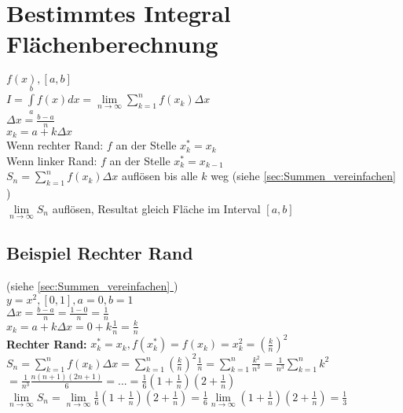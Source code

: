 \documentclass[../main.tex]{subfiles}
\begin{document}
\section{Bestimmtes Integral Flächenberechnung}
$f(x), [a,b]$ \\ [7pt]
$I = \int\limits_a^bf(x)dx = \lim\limits_{n \to \infty} \sum\limits^n_{k=1}f(x_k)\Delta x$ \\ [7pt]
$\Delta x = \frac{b-a}{n}$ \\ [7pt]
$x_k = a + k \Delta x$ \\ [7pt]
Wenn rechter Rand: $f$ an der Stelle $x^*_k = x_k$ \\ [7pt]
Wenn linker Rand: $f$ an der Stelle $x^*_k = x_{k-1}$ \\ [7pt]
$S_n = \sum\limits^n_{k=1}f(x_k)\Delta x$ auflösen bis alle $k$ weg (siehe \hyperref[sec:Summen_vereinfachen]{\ref{sec:Summen_vereinfachen} }) \\ [7pt]
$\lim\limits_{n \to \infty} S_n$ auflösen, Resultat gleich Fläche im Interval $[a,b]$

\subsection{Beispiel Rechter Rand}
(siehe \hyperref[sec:Summen_vereinfachen]{\ref{sec:Summen_vereinfachen} }) \\
$y = x^2, [0,1], a=0, b=1$ \\ [7pt]
$\Delta x = \frac{b-a}{n} = \frac{1-0}{n} = \frac{1}{n}$ \\ [7pt]
$x_k = a + k \Delta x = 0 + k \frac{1}{n} = \frac{k}{n}$ \\ [7pt]
\textbf{Rechter Rand:} $x^*_k = x_k, f(x^*_k)=f(x_k)=x^2_k = (\frac{k}{n})^2$ \\ [7pt]
$S_n = \sum\limits^n_{k=1}f(x_k)\Delta x = \sum\limits^n_{k=1} (\frac{k}{n})^2 \frac{1}{n} 
= \sum\limits^n_{k=1} \frac{k^2}{n^3}
= \frac{1}{n^3} \sum\limits^n_{k=1} k^2$ \\ [7pt]
$ = \frac{1}{n^3} \frac{n(n+1)(2n+1)}{6} = ... = \frac{1}{6}(1 + \frac{1}{n})(2 + \frac{1}{n})$ \\ [7pt]
$\lim\limits_{n \to \infty} S_n = \lim\limits_{n \to \infty} \frac{1}{6}(1 + \frac{1}{n})(2 + \frac{1}{n})
= \frac{1}{6} \lim\limits_{n \to \infty} (1 + \frac{1}{n})(2 + \frac{1}{n}) = \frac{1}{3}$
\end{document}
